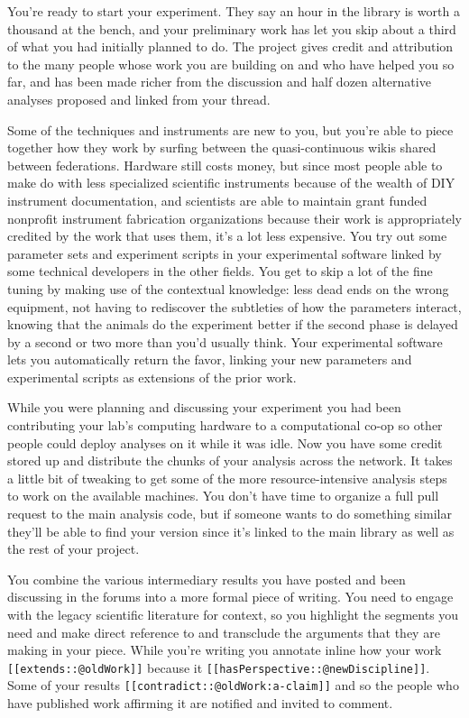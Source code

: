 \documentclass[10pt]{article}
\begin{document}
\begin{multicols}{2}
You're ready to start your experiment. They say an hour in the library
is worth a thousand at the bench, and your preliminary work has let you
skip about a third of what you had initially planned to do. The project
gives credit and attribution to the many people whose work you are
building on and who have helped you so far, and has been made richer
from the discussion and half dozen alternative analyses proposed and
linked from your thread.

Some of the techniques and instruments are new to you, but you're able
to piece together how they work by surfing between the quasi-continuous
wikis shared between federations. Hardware still costs money, but since
most people able to make do with less specialized scientific instruments
because of the wealth of DIY instrument documentation, and scientists
are able to maintain grant funded nonprofit instrument fabrication
organizations because their work is appropriately credited by the work
that uses them, it's a lot less expensive. You try out some parameter
sets and experiment scripts in your experimental software linked by some
technical developers in the other fields. You get to skip a lot of the
fine tuning by making use of the contextual knowledge: less dead ends on
the wrong equipment, not having to rediscover the subtleties of how the
parameters interact, knowing that the animals do the experiment better
if the second phase is delayed by a second or two more than you'd
usually think. Your experimental software lets you automatically return
the favor, linking your new parameters and experimental scripts as
extensions of the prior work.

While you were planning and discussing your experiment you had been
contributing your lab's computing hardware to a computational co-op so
other people could deploy analyses on it while it was idle. Now you have
some credit stored up and distribute the chunks of your analysis across
the network. It takes a little bit of tweaking to get some of the more
resource-intensive analysis steps to work on the available machines. You
don't have time to organize a full pull request to the main analysis
code, but if someone wants to do something similar they'll be able to
find your version since it's linked to the main library as well as the
rest of your project.

You combine the various intermediary results you have posted and been
discussing in the forums into a more formal piece of writing. You need
to engage with the legacy scientific literature for context, so you
highlight the segments you need and make direct reference to and
transclude the arguments that they are making in your piece. While
you're writing you annotate inline how your work
\texttt{{[}{[}extends::@oldWork{]}{]}} because it
\texttt{{[}{[}hasPerspective::@newDiscipline{]}{]}}. Some of your
results \texttt{{[}{[}contradict::@oldWork:a-claim{]}{]}} and so the
people who have published work affirming it are notified and invited to
comment.


\end{multicols}
\end{document}
